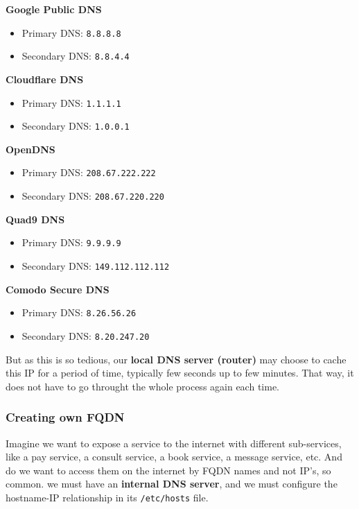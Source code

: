 \documentclass{article}
\begin{document}
\textbf{Google Public DNS}
\begin{itemize}
    \item Primary DNS: \texttt{8.8.8.8}
    \item Secondary DNS: \texttt{8.8.4.4}
\end{itemize}
    
\textbf{Cloudflare DNS}
\begin{itemize}
    \item Primary DNS: \texttt{1.1.1.1}
    \item Secondary DNS: \texttt{1.0.0.1}
\end{itemize}
    
\textbf{OpenDNS}
\begin{itemize}
    \item Primary DNS: \texttt{208.67.222.222}
    \item Secondary DNS: \texttt{208.67.220.220}
\end{itemize}
    
\textbf{Quad9 DNS}
\begin{itemize}
    \item Primary DNS: \texttt{9.9.9.9}
    \item Secondary DNS: \texttt{149.112.112.112}
\end{itemize}
    
\textbf{Comodo Secure DNS}
\begin{itemize}
    \item Primary DNS: \texttt{8.26.56.26}
    \item Secondary DNS: \texttt{8.20.247.20}
\end{itemize}

But as this is so tedious, our \textbf{local DNS server (router)} may choose to cache this IP for a period of time, typically few seconds up to few minutes. That way, it does not have to go throught the whole process again each time.

\subsubsection{Creating own FQDN}

Imagine we want to expose a service to the internet with different sub-services, like a pay service, a consult service, a book service, a message service, etc. And do we want to access them on the internet by FQDN names and not IP's, so common. we must have an \textbf{internal DNS server}, and we must configure the hostname-IP relationship in its \verb|/etc/hosts| file.
\end{document}
